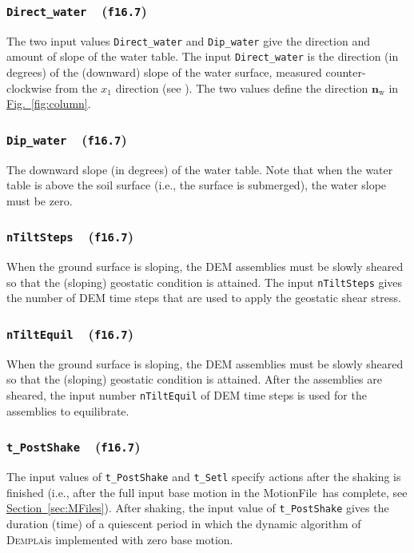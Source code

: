 \documentclass[letterpaper,11pt]{article}
\newcommand{\Dempla}{\textsc{Dempla}}
\newcommand{\Var}[2]{\texttt{#1}\ \  (\texttt{#2})}
\newcommand{\MotionFile}{\textsf{MotionFile}}
\begin{document}
\subsubsection[\texttt{Direct\_water}]{\Var{Direct\_water}{f16.7}}
The two input values \texttt{Direct\_water} and \texttt{Dip\_water}
give the direction and amount of slope of the water table.
The input \texttt{Direct\_water} is
the direction (in degrees) of the (downward) slope of the water
surface, measured coun\-ter-clock\-wise
from the $x_{1}$ direction (see \citep{Kuhn:2021a}).
The two values define the direction $\mathbf{n}_{\text{w}}$
in \hyperref[fig:column]{Fig.~\ref*{fig:column}}.
%
\subsubsection[\texttt{Dip\_water}]{\Var{Dip\_water}{f16.7}}
The downward slope (in degrees) of the water table.
Note that when the water table is above the soil surface
(i.e., the surface is submerged), the water slope must be zero.
%
\subsubsection[\texttt{nTiltSteps}]{\Var{nTiltSteps}{f16.7}}
When the ground surface is sloping,
the DEM assemblies must be slowly sheared so that the
(sloping) geostatic condition is attained.
The input \texttt{nTiltSteps} gives the number of
DEM time steps that are used to apply the geostatic
shear stress.
%
\subsubsection[\texttt{nTiltEquil}]{\Var{nTiltEquil}{f16.7}}
When the ground surface is sloping,
the DEM assemblies must be slowly sheared so that the
(sloping) geostatic condition is attained.
After the assemblies are sheared,
the input number \texttt{nTiltEquil} of DEM time steps
is used for the assemblies to equilibrate.
%
\subsubsection[\texttt{t\_PostShake}]{\Var{t\_PostShake}{f16.7}}
The input values of \texttt{t\_PostShake} and \texttt{t\_Setl}
specify actions after the shaking is finished
(i.e., after the full input base motion in
the \MotionFile\ has complete, see
\hyperref[sec:MFiles]{Section~\ref*{sec:MFiles}}).
After shaking,
the input value of \texttt{t\_PostShake} gives the
duration (time) of a quiescent period in which the
dynamic algorithm of \Dempla is implemented with zero
base motion. 
%
\end{document}
